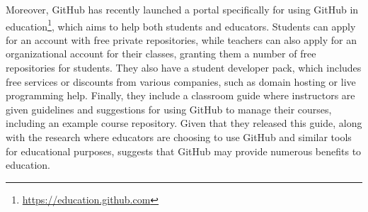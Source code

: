 Moreover, GitHub has recently launched a portal specifically for using GitHub in education\footnote{\url{https://education.github.com}}, which aims to help both students and educators. Students can apply for an account with free private repositories, while teachers can also apply for an organizational account for their classes, granting them a number of free repositories for students. They also have a student developer pack, which includes free services or discounts from various companies, such as domain hosting or live programming help. Finally, they include a classroom guide where instructors are given guidelines and suggestions for using GitHub to manage their courses, including an example course repository. Given that they released this guide, along with the research where educators are choosing to use GitHub and similar tools for educational purposes, suggests that GitHub may provide numerous benefits to education.
